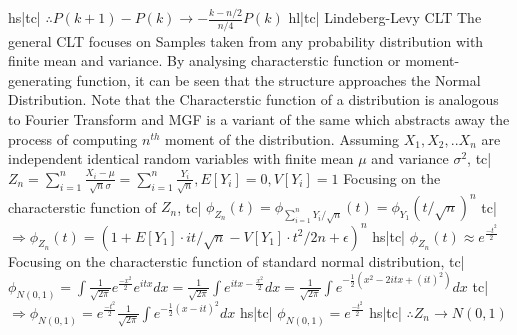 hs|tc| \( \therefore P(k+1)-P(k) \rightarrow -\frac{k-n/2}{n/4}P(k) \)
hl|tc| Lindeberg-Levy CLT
The general CLT focuses on Samples taken from any probability distribution with finite mean and variance. By analysing characterstic function or moment-generating function, it can be seen that the structure approaches the Normal Distribution.
Note that the Characterstic function of a distribution is analogous to Fourier Transform and MGF is a variant of the same which abstracts away the process of computing \(n^{th}\) moment of the distribution.
Assuming \({X_1,X_2,..X_n}\) are independent identical random variables with finite mean \(\mu\) and variance \(\sigma^2\),
tc| \( Z_n = \sum_{i=1}^{n}\frac{X_i - \mu}{\sqrt{n}\sigma} = \sum_{i=1}^{n}\frac{Y_i}{\sqrt{n}}, E[Y_i] = 0, V[Y_i] = 1 \)
Focusing on the characterstic function of \(Z_n\),
tc| \( \phi_{Z_n}(t) = \phi_{\sum_{i=1}^{n}Y_i/\sqrt{n}}(t) = \phi_{Y_1}(t/\sqrt{n})^n \)
tc| \( \Rightarrow \phi_{Z_n}(t) = (1 + E[Y_1]\cdot it/\sqrt{n} - V[Y_1]\cdot t^2/2n + \epsilon)^n \)
hs|tc| \( \phi_{Z_n}(t) \approx e^{\frac{-t^2}{2}} \)
Focusing on the characterstic function of standard normal distribution,
tc| \( \phi_{N(0,1)} = \int \frac{1}{\sqrt{2\pi}} e^{\frac{-x^2}{2}} e^{itx} dx = \frac{1}{\sqrt{2\pi}} \int e^{itx - \frac{x^2}{2}} dx = \frac{1}{\sqrt{2\pi}} \int e^{-\frac{1}{2} (x^2 - 2itx + (it)^2)} dx \)
tc| \( \Rightarrow \phi_{N(0,1)} = e^{\frac{-t^2}{2}} \frac{1}{\sqrt{2\pi}} \int e^{-\frac{1}{2} (x - it)^2} dx \)
hs|tc| \( \phi_{N(0,1)} = e^{\frac{-t^2}{2}} \)
hs|tc| \( \therefore Z_n \rightarrow N(0, 1) \)